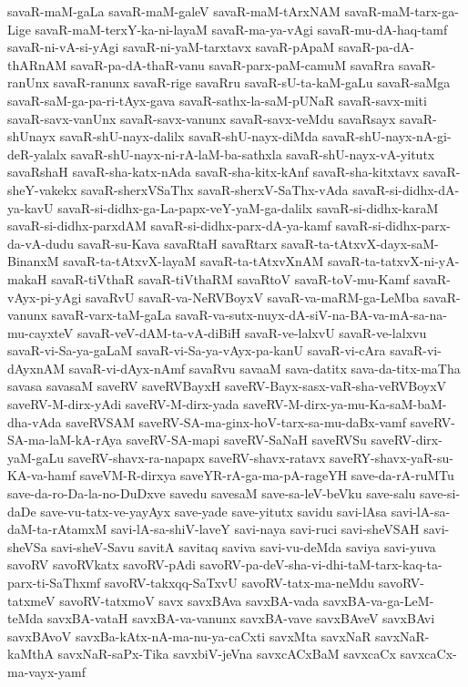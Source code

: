 {savaR-maM-gaLa
savaR-maM-galeV
savaR-maM-tArxNAM
savaR-maM-tarx-ga-Lige
savaR-maM-terxY-ka-ni-layaM
savaR-ma-ya-vAgi
savaR-mu-dA-haq-tamf
savaR-ni-vA-si-yAgi
savaR-ni-yaM-tarxtavx
savaR-pApaM
savaR-pa-dA-thARnAM
savaR-pa-dA-thaR-vanu
savaR-parx-paM-camuM
savaRra
savaR-ranUnx
savaR-ranunx
savaR-rige
savaRru
savaR-sU-ta-kaM-gaLu
savaR-saMga
savaR-saM-ga-pa-ri-tAyx-gava
savaR-sathx-la-saM-pUNaR
savaR-savx-miti
savaR-savx-vanUnx
savaR-savx-vanunx
savaR-savx-veMdu
savaRsayx
savaR-shUnayx
savaR-shU-nayx-dalilx
savaR-shU-nayx-diMda
savaR-shU-nayx-nA-gi-deR-yalalx
savaR-shU-nayx-ni-rA-laM-ba-sathxla
savaR-shU-nayx-vA-yitutx
savaRshaH
savaR-sha-katx-nAda
savaR-sha-kitx-kAnf
savaR-sha-kitxtavx
savaR-sheY-vakekx
savaR-sherxVSaThx
savaR-sherxV-SaThx-vAda
savaR-si-didhx-dA-ya-kavU
savaR-si-didhx-ga-La-papx-veY-yaM-ga-dalilx
savaR-si-didhx-karaM
savaR-si-didhx-parxdAM
savaR-si-didhx-parx-dA-ya-kamf
savaR-si-didhx-parx-da-vA-dudu
savaR-su-Kava
savaRtaH
savaRtarx
savaR-ta-tAtxvX-dayx-saM-BinanxM
savaR-ta-tAtxvX-layaM
savaR-ta-tAtxvXnAM
savaR-ta-tatxvX-ni-yA-makaH
savaR-tiVthaR
savaR-tiVthaRM
savaRtoV
savaR-toV-mu-Kamf
savaR-vAyx-pi-yAgi
savaRvU
savaR-va-NeRVBoyxV
savaR-va-maRM-ga-LeMba
savaR-vanunx
savaR-varx-taM-gaLa
savaR-va-sutx-nuyx-dA-siV-na-BA-va-mA-sa-na-mu-cayxteV
savaR-veV-dAM-ta-vA-diBiH
savaR-ve-lalxvU
savaR-ve-lalxvu
savaR-vi-Sa-ya-gaLaM
savaR-vi-Sa-ya-vAyx-pa-kanU
savaR-vi-cAra
savaR-vi-dAyxnAM
savaR-vi-dAyx-nAmf
savaRvu
savaaM
sava-datitx
sava-da-titx-maTha
savasa
savasaM
saveRV
saveRVBayxH
saveRV-Bayx-sasx-vaR-sha-veRVBoyxV
saveRV-M-dirx-yAdi
saveRV-M-dirx-yada
saveRV-M-dirx-ya-mu-Ka-saM-baM-dha-vAda
saveRVSAM
saveRV-SA-ma-ginx-hoV-tarx-sa-mu-daBx-vamf
saveRV-SA-ma-laM-kA-rAya
saveRV-SA-mapi
saveRV-SaNaH
saveRVSu
saveRV-dirx-yaM-gaLu
saveRV-shavx-ra-napapx
saveRV-shavx-ratavx
saveRY-shavx-yaR-su-KA-va-hamf
saveVM-R-dirxya
saveYR-rA-ga-ma-pA-rageYH
save-da-rA-ruMTu
save-da-ro-Da-la-no-DuDxve
savedu
savesaM
save-sa-leV-beVku
save-salu
save-si-daDe
save-vu-tatx-ve-yayAyx
save-yade
save-yitutx
savidu
savi-lAsa
savi-lA-sa-daM-ta-rAtamxM
savi-lA-sa-shiV-laveY
savi-naya
savi-ruci
savi-sheVSAH
savi-sheVSa
savi-sheV-Savu
savitA
savitaq
saviva
savi-vu-deMda
saviya
savi-yuva
savoRV
savoRVkatx
savoRV-pAdi
savoRV-pa-deV-sha-vi-dhi-taM-tarx-kaq-ta-parx-ti-SaThxmf
savoRV-takxqq-SaTxvU
savoRV-tatx-ma-neMdu
savoRV-tatxmeV
savoRV-tatxmoV
savx
savxBAva
savxBA-vada
savxBA-va-ga-LeM-teMda
savxBA-vataH
savxBA-va-vanunx
savxBA-vave
savxBAveV
savxBAvi
savxBAvoV
savxBa-kAtx-nA-ma-nu-ya-caCxti
savxMta
savxNaR
savxNaR-kaMthA
savxNaR-saPx-Tika
savxbiV-jeVna
savxcACxBaM
savxcaCx
savxcaCx-ma-vayx-yamf
}

